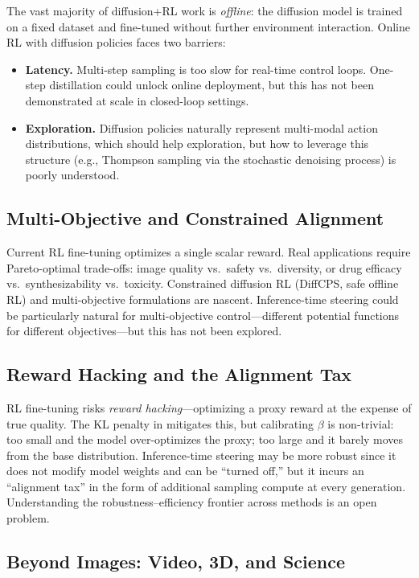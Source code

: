 \documentclass[11pt]{article}
\begin{document}
The vast majority of diffusion+RL work is \emph{offline}: the diffusion model is trained on a fixed dataset and fine-tuned without further environment interaction.
Online RL with diffusion policies faces two barriers:
\begin{itemize}
    \item \textbf{Latency.} Multi-step sampling is too slow for real-time control loops. One-step distillation could unlock online deployment, but this has not been demonstrated at scale in closed-loop settings.
    \item \textbf{Exploration.} Diffusion policies naturally represent multi-modal action distributions, which should help exploration, but how to leverage this structure (e.g., Thompson sampling via the stochastic denoising process) is poorly understood.
\end{itemize}

\subsection{Multi-Objective and Constrained Alignment}

Current RL fine-tuning optimizes a single scalar reward.
Real applications require Pareto-optimal trade-offs: image quality vs.\ safety vs.\ diversity, or drug efficacy vs.\ synthesizability vs.\ toxicity.
Constrained diffusion RL (DiffCPS, safe offline RL) and multi-objective formulations are nascent.
Inference-time steering could be particularly natural for multi-objective control---different potential functions for different objectives---but this has not been explored.

\subsection{Reward Hacking and the Alignment Tax}

RL fine-tuning risks \emph{reward hacking}---optimizing a proxy reward at the expense of true quality.
The KL penalty in  mitigates this, but calibrating $\beta$ is non-trivial: too small and the model over-optimizes the proxy; too large and it barely moves from the base distribution.
Inference-time steering may be more robust since it does not modify model weights and can be ``turned off,'' but it incurs an ``alignment tax'' in the form of additional sampling compute at every generation.
Understanding the robustness--efficiency frontier across methods is an open problem.

\subsection{Beyond Images: Video, 3D, and Science}
\end{document}
